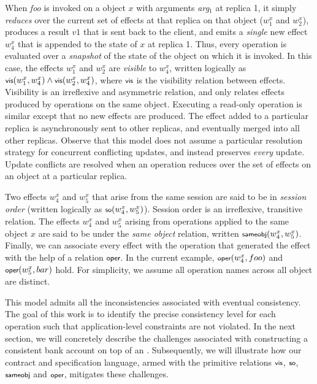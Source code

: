 When \emph{foo} is invoked on a object $x$ with arguments \emph{arg}$_1$ at
replica 1, it simply \emph{reduces} over the current set of effects at that
replica on that object ($w^x_1$ and $w^x_2$), produces a result $v1$ that is
sent back to the client, and emits a \emph{single} new effect $w^x_4$ that is
appended to the state of $x$ at replica 1. Thus, every operation is evaluated
over a \emph{snapshot} of the state of the object on which it is invoked. In
this case, the effects $w^x_1$ and $w^x_2$ are \emph{visible} to $w^x_4$,
written logically as $\small \vis{w^x_1}{w^x_4} \wedge \vis{w^x_2}{w^x_4}$,
where $\small \visZ$ is the visibility relation between effects. Visibility is
an irreflexive and asymmetric relation, and only relates effects produced by
operations on the same object. Executing a read-only operation is similar
except that no new effects are produced. The effect added to a particular
replica is asynchronously sent to other replicas, and eventually merged into
all other replicas. Observe that this model does not assume a particular
resolution strategy for concurrent conflicting updates, and instead preserves
\emph{every} update. Update conflicts are resolved when an operation reduces
over the set of effects on an object at a particular replica.

Two effects $w^x_4$ and $w^x_5$ that arise from the same session are said to be
in \emph{session order} (written logically as $\small \so{w^x_4}{w^x_5}$).
Session order is an irreflexive, transitive relation. The effects $w^x_4$ and
$w^x_5$ arising from operations applied to the same object $x$ are said to be
under the \emph{same object} relation, written $\small \sameobj{w^x_4}{w^x_5}$.
Finally, we can associate every effect with the operation that generated the
effect with the help of a relation $\small \operZ$. In the current example,
$\small \oper{w^x_4}{foo}$ and $\small \oper{w^x_5}{bar}$ hold. For simplicity,
we assume all operation names across all object are distinct.

This model admits all the inconsistencies associated with eventual consistency.
The goal of this work is to identify the precise consistency level for each
operation such that application-level constraints are not violated. In the next
section, we will concretely describe the challenges associated with
constructing a consistent bank account on top of an \ecds. Subsequently, we
will illustrate how our contract and specification language, armed with the
primitive relations $\small \visZ$, $\small \soZ$, $\small \sameobjZ$ and
$\small \operZ$, mitigates these challenges.
